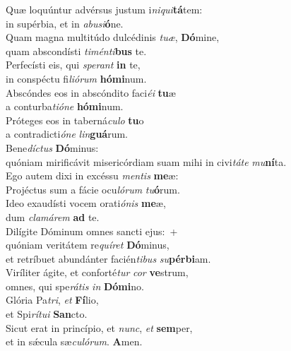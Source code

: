 \evenverse Quæ loquúntur advérsus justum i\textit{ni}\textit{qui}\textbf{tá}tem:~\*\\
\evenverse in supérbia, et in \textit{a}\textit{bu}\textit{si}\textbf{ó}ne.\\
\oddverse Quam magna multitúdo dulcédinis \textit{tu}\textit{æ}, \textbf{Dó}mine,~\*\\
\oddverse quam abscondísti \textit{ti}\textit{mén}\textit{ti}\textbf{bus} te.\\
\evenverse Perfecísti eis, qui \textit{spe}\textit{rant} \textbf{in} te,~\*\\
\evenverse in conspéctu fi\textit{li}\textit{ó}\textit{rum} \textbf{hó}\textbf{mi}num.\\
\oddverse Abscóndes eos in abscóndito faci\textit{é}\textit{i} \textbf{tu}æ~\*\\
\oddverse a conturba\textit{ti}\textit{ó}\textit{ne} \textbf{hó}\textbf{mi}num.\\
\evenverse Próteges eos in taberná\textit{cu}\textit{lo} \textbf{tu}o~\*\\
\evenverse a contradicti\textit{ó}\textit{ne} \textit{lin}\textbf{guá}rum.\\
\oddverse Bene\textit{dí}\textit{ctus} \textbf{Dó}minus:~\*\\
\oddverse quóniam mirificávit misericórdiam suam mihi in civi\textit{tá}\textit{te} \textit{mu}\textbf{ní}ta.\\
\evenverse Ego autem dixi in excéssu \textit{men}\textit{tis} \textbf{me}æ:~\*\\
\evenverse Projéctus sum a fácie ocu\textit{ló}\textit{rum} \textit{tu}\textbf{ó}rum.\\
\oddverse Ideo exaudísti vocem orati\textit{ó}\textit{nis} \textbf{me}æ,~\*\\
\oddverse dum \textit{cla}\textit{má}\textit{rem} \textbf{ad} te.\\
\evenverse Dilígite Dóminum omnes sancti ejus:~+\\
\evenverse  quóniam veritátem re\textit{quí}\textit{ret} \textbf{Dó}minus,~\*\\
\evenverse et retríbuet abundánter facién\textit{ti}\textit{bus} \textit{su}\textbf{pér}\textbf{bi}am.\\
\oddverse Viríliter ágite, et conforté\textit{tur} \textit{cor} \textbf{ve}strum,~\*\\
\oddverse omnes, qui spe\textit{rá}\textit{tis} \textit{in} \textbf{Dó}\textbf{mi}no.\\
\evenverse Glória Pa\textit{tri}, \textit{et} \textbf{Fí}lio,~\*\\
\evenverse et Spi\textit{rí}\textit{tu}\textit{i} \textbf{San}cto.\\
\oddverse Sicut erat in princípio, et \textit{nunc}, \textit{et} \textbf{sem}per,~\*\\
\oddverse et in sǽcula sæ\textit{cu}\textit{ló}\textit{rum}. \textbf{A}men.\\
